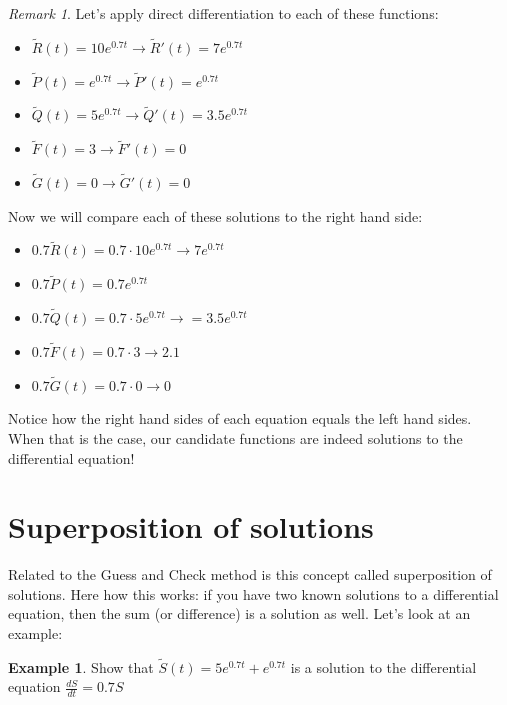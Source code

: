 \documentclass[
]{book}
\providecommand{\tightlist}{%
  \setlength{\itemsep}{0pt}\setlength{\parskip}{0pt}}
\theoremstyle{definition}
\theoremstyle{definition}
\newtheorem{example}{Example}[chapter]
\theoremstyle{definition}
\theoremstyle{remark}
\newtheorem*{remark}{Remark}
\begin{document}
\begin{remark}
{}Let's apply direct differentiation to each of these functions:

\begin{itemize}
\tightlist
\item
  \(\tilde{R}(t) = 10e^{0.7t} \rightarrow \tilde{R}'(t) = 7e^{0.7t}\)
\item
  \(\tilde{P}(t) = e^{0.7t} \rightarrow \tilde{P}'(t) = e^{0.7t}\)
\item
  \(\tilde{Q}(t) = 5e^{0.7t} \rightarrow \tilde{Q}'(t) = 3.5e^{0.7t}\)
\item
  \(\tilde{F}(t)=3 \rightarrow \tilde{F}'(t) = 0\)
\item
  \(\tilde{G}(t)=0 \rightarrow \tilde{G}'(t) = 0\)
\end{itemize}

Now we will compare each of these solutions to the right hand side:

\begin{itemize}
\tightlist
\item
  \(0.7\tilde{R}(t) = 0.7 \cdot 10e^{0.7t} \rightarrow 7e^{0.7t}\)
\item
  \(0.7\tilde{P}(t) = 0.7 e^{0.7t}\)
\item
  \(0.7\tilde{Q}(t) = 0.7 \cdot 5e^{0.7t} \rightarrow = 3.5e^{0.7t}\)
\item
  \(0.7 \tilde{F}(t)=0.7 \cdot 3 \rightarrow 2.1\)
\item
  \(0.7 \tilde{G}(t)=0.7 \cdot 0 \rightarrow 0\)
\end{itemize}

Notice how the right hand sides of each equation equals the left hand sides. When that is the case, our candidate functions are indeed solutions to the differential equation!
\end{remark}

\hypertarget{superposition-of-solutions}{%
\section{Superposition of solutions}\label{superposition-of-solutions}}

Related to the Guess and Check method is this concept called superposition of solutions. Here how this works: if you have two known solutions to a differential equation, then the sum (or difference) is a solution as well. Let's look at an example:

\begin{example}
\protect\hypertarget{exm:unnamed-chunk-116}{}{\label{exm:unnamed-chunk-116} }Show that \(\tilde{S}(t) = 5e^{0.7t} + e^{0.7t}\) is a solution to the differential equation \(\displaystyle \frac{dS}{dt} = 0.7 S\)
\end{example}
\end{document}
